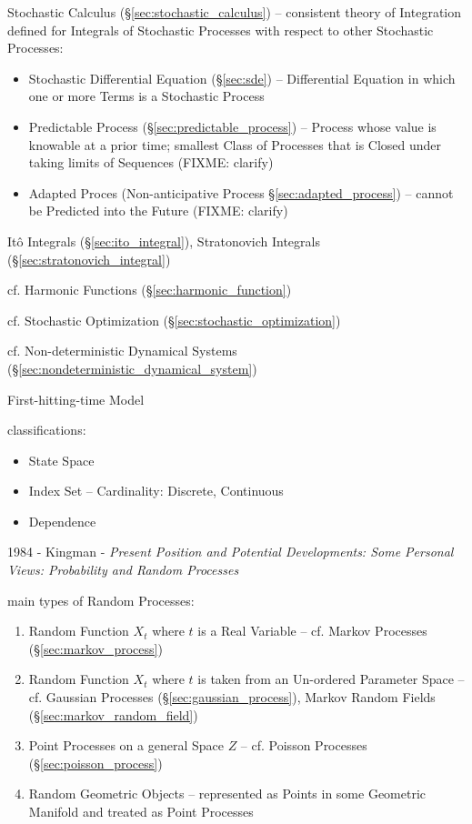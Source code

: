 \fist Stochastic Calculus (\S\ref{sec:stochastic_calculus}) -- consistent theory
of Integration defined for Integrals of Stochastic Processes with respect to
other Stochastic Processes:
\begin{itemize}
  \item Stochastic Differential Equation (\S\ref{sec:sde}) -- Differential
    Equation in which one or more Terms is a Stochastic Process
  \item Predictable Process (\S\ref{sec:predictable_process}) -- Process whose
    value is knowable at a prior time; smallest Class of Processes that is
    Closed under taking limits of Sequences (FIXME: clarify)
  \item Adapted Proces (Non-anticipative Process \S\ref{sec:adapted_process}) --
    cannot be Predicted into the Future (FIXME: clarify)
\end{itemize}
It\^o Integrals (\S\ref{sec:ito_integral}), Stratonovich Integrals
(\S\ref{sec:stratonovich_integral})

cf. Harmonic Functions (\S\ref{sec:harmonic_function})

\fist cf. Stochastic Optimization (\S\ref{sec:stochastic_optimization})

\fist cf. Non-deterministic Dynamical Systems
(\S\ref{sec:nondeterministic_dynamical_system})

First-hitting-time Model

classifications:

\begin{itemize}
  \item State Space
  \item Index Set -- Cardinality: Discrete, Continuous
  \item Dependence
\end{itemize}

1984 - Kingman - \emph{Present Position and Potential Developments: Some
  Personal Views: Probability and Random Processes}

main types of Random Processes:
\begin{enumerate}
  \item Random Function $X_t$ where $t$ is a Real Variable -- cf. Markov
    Processes (\S\ref{sec:markov_process})
  \item Random Function $X_t$ where $t$ is taken from an Un-ordered Parameter
    Space -- cf. Gaussian Processes (\S\ref{sec:gaussian_process}), Markov
    Random Fields (\S\ref{sec:markov_random_field})
  \item Point Processes on a general Space $Z$ -- cf. Poisson Processes
    (\S\ref{sec:poisson_process})
  \item Random Geometric Objects -- represented as Points in some Geometric
    Manifold and treated as Point Processes
\end{enumerate}

